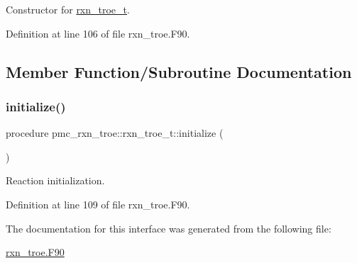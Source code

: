 Constructor for \mbox{\hyperlink{structpmc__rxn__troe_1_1rxn__troe__t}{rxn\+\_\+troe\+\_\+t}}. 

Definition at line 106 of file rxn\+\_\+troe.\+F90.



\subsection{Member Function/\+Subroutine Documentation}
\mbox{\label{structpmc__rxn__troe_1_1rxn__troe__t_abaf1df0720e6e47f0a29c2aab399f137}} 
\subsubsection{\texorpdfstring{initialize()}{initialize()}}
{\footnotesize\ttfamily procedure pmc\+\_\+rxn\+\_\+troe\+::rxn\+\_\+troe\+\_\+t\+::initialize (\begin{DoxyParamCaption}{ }\end{DoxyParamCaption})\hspace{0.3cm}{\ttfamily [private]}}



Reaction initialization. 



Definition at line 109 of file rxn\+\_\+troe.\+F90.



The documentation for this interface was generated from the following file\+:\begin{DoxyCompactItemize}
\item 
\mbox{\hyperlink{rxn__troe_8_f90}{rxn\+\_\+troe.\+F90}}\end{DoxyCompactItemize}
